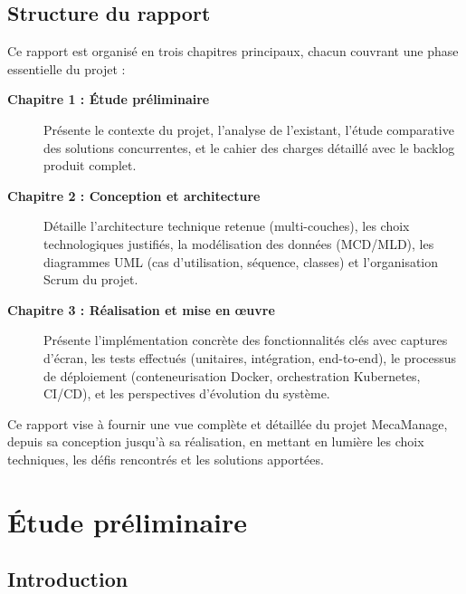 \section*{Structure du rapport}

Ce rapport est organisé en trois chapitres principaux, chacun couvrant une phase essentielle du projet :

\begin{description}
    \item[\textbf{Chapitre 1 : Étude préliminaire}] Présente le contexte du projet, l'analyse de l'existant, l'étude comparative des solutions concurrentes, et le cahier des charges détaillé avec le backlog produit complet.
    
    \item[\textbf{Chapitre 2 : Conception et architecture}] Détaille l'architecture technique retenue (multi-couches), les choix technologiques justifiés, la modélisation des données (MCD/MLD), les diagrammes UML (cas d'utilisation, séquence, classes) et l'organisation Scrum du projet.
    
    \item[\textbf{Chapitre 3 : Réalisation et mise en œuvre}] Présente l'implémentation concrète des fonctionnalités clés avec captures d'écran, les tests effectués (unitaires, intégration, end-to-end), le processus de déploiement (conteneurisation Docker, orchestration Kubernetes, CI/CD), et les perspectives d'évolution du système.
\end{description}

\vspace{1cm}

Ce rapport vise à fournir une vue complète et détaillée du projet MecaManage, depuis sa conception jusqu'à sa réalisation, en mettant en lumière les choix techniques, les défis rencontrés et les solutions apportées.

\newpage


\chapter{Étude préliminaire}

\section{Introduction}

